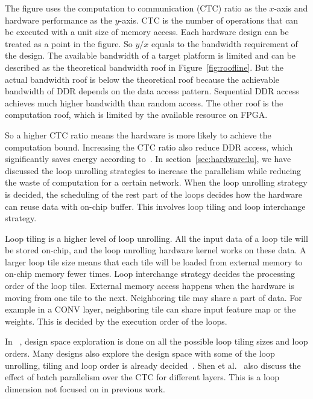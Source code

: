 The figure uses the computation to communication (CTC) ratio as the $x$-axis and hardware performance as the $y$-axis. CTC is the number of operations that can be executed with a unit size of memory access. Each hardware design can be treated as a point in the figure. So $y/x$ equals to the bandwidth requirement of the design. The available bandwidth of a target platform is limited and can be described as the theoretical bandwidth roof in Figure~\ref{fig:roofline}. But the actual bandwidth roof is below the theoretical roof because the achievable bandwidth of DDR depends on the data access pattern. Sequential DDR access achieves much higher bandwidth than random access. The other roof is the computation roof, which is limited by the available resource on FPGA.

So a higher CTC ratio means the hardware is more likely to achieve the computation bound. Increasing the CTC ratio also reduce DDR access, which significantly saves energy according to~\cite{vlsi_energy}. In section~\ref{sec:hardware:lu}, we have discussed the loop unrolling strategies to increase the parallelism while reducing the waste of computation for a certain network. When the loop unrolling strategy is decided, the scheduling of the rest part of the loops decides how the hardware can reuse data with on-chip buffer. This involves loop tiling and loop interchange strategy.

Loop tiling is a higher level of loop unrolling. All the input data of a loop tile will be stored on-chip, and the loop unrolling hardware kernel works on these data. A larger loop tile size means that each tile will be loaded from external memory to on-chip memory fewer times. Loop interchange strategy decides the processing order of the loop tiles. External memory access happens when the hardware is moving from one tile to the next. Neighboring tile may share a part of data. For example in a CONV layer, neighboring tile can share input feature map or the weights. This is decided by the execution order of the loops. 

In ~\cite{zhang2015optimizing, ma2017optimizing}, design space exploration is done on all the possible loop tiling sizes and loop orders. Many designs also explore the design space with some of the loop unrolling, tiling and loop order is already decided~\cite{motamedi2016design, qiu2016going}. Shen et al.~\cite{shen2017escher} also discuss the effect of batch parallelism over the CTC for different layers. This is a loop dimension not focused on in previous work.

